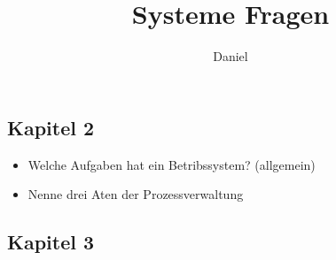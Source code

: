 \documentclass[10pt,a4paper]{article}
\author{Daniel}
\title{Systeme Fragen}
\begin{document}
\maketitle

\subsection*{Kapitel 2}

\begin{itemize}
\item  Welche Aufgaben hat ein Betribssystem? (allgemein)

\item Nenne drei Aten der Prozessverwaltung

\end{itemize}

\subsection*{Kapitel 3}
\end{document}
